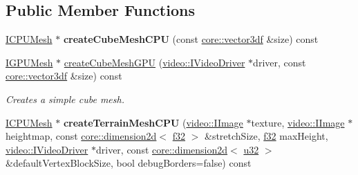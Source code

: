 \subsection*{Public Member Functions}
\begin{DoxyCompactItemize}
\item 
\hyperlink{classirr_1_1scene_1_1IMesh}{I\+C\+P\+U\+Mesh} $\ast$ {\bfseries create\+Cube\+Mesh\+C\+PU} (const \hyperlink{namespaceirr_1_1core_a06f169d08b5c429f5575acb7edbad811}{core\+::vector3df} \&size) const \hypertarget{classirr_1_1scene_1_1CGeometryCreator_a6f50727c9761662a71b6107b56755db5}{}\label{classirr_1_1scene_1_1CGeometryCreator_a6f50727c9761662a71b6107b56755db5}

\item 
\hyperlink{classirr_1_1scene_1_1IMesh}{I\+G\+P\+U\+Mesh} $\ast$ \hyperlink{classirr_1_1scene_1_1CGeometryCreator_a9aea899bffc8dc7042f4b2d8d176f40d}{create\+Cube\+Mesh\+G\+PU} (\hyperlink{classirr_1_1video_1_1IVideoDriver}{video\+::\+I\+Video\+Driver} $\ast$driver, const \hyperlink{namespaceirr_1_1core_a06f169d08b5c429f5575acb7edbad811}{core\+::vector3df} \&size) const 
\begin{DoxyCompactList}\small\item\em Creates a simple cube mesh. \end{DoxyCompactList}\item 
\hyperlink{classirr_1_1scene_1_1IMesh}{I\+C\+P\+U\+Mesh} $\ast$ {\bfseries create\+Terrain\+Mesh\+C\+PU} (\hyperlink{classirr_1_1video_1_1IImage}{video\+::\+I\+Image} $\ast$texture, \hyperlink{classirr_1_1video_1_1IImage}{video\+::\+I\+Image} $\ast$heightmap, const \hyperlink{classirr_1_1core_1_1dimension2d}{core\+::dimension2d}$<$ \hyperlink{namespaceirr_a0277be98d67dc26ff93b1a6a1d086b07}{f32} $>$ \&stretch\+Size, \hyperlink{namespaceirr_a0277be98d67dc26ff93b1a6a1d086b07}{f32} max\+Height, \hyperlink{classirr_1_1video_1_1IVideoDriver}{video\+::\+I\+Video\+Driver} $\ast$driver, const \hyperlink{classirr_1_1core_1_1dimension2d}{core\+::dimension2d}$<$ \hyperlink{namespaceirr_a0416a53257075833e7002efd0a18e804}{u32} $>$ \&default\+Vertex\+Block\+Size, bool debug\+Borders=false) const \hypertarget{classirr_1_1scene_1_1CGeometryCreator_ae8b0311a5836d5910dd018caa6992ca1}{}\label{classirr_1_1scene_1_1CGeometryCreator_ae8b0311a5836d5910dd018caa6992ca1}


\end{DoxyCompactItemize}
